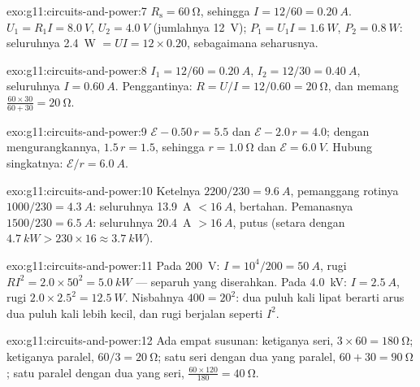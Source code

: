 \begin{solution}{exo:g11:circuits-and-power:7}
$R_{\text{s}} = \qty{60}{\ohm}$, sehingga $I = 12/60 = \qty{0.20}{A}$.
$U_1 = R_1 I = \qty{8.0}{V}$, $U_2 = \qty{4.0}{V}$ (jumlahnya
\qty{12}{V}); $P_1 = U_1 I = \qty{1.6}{W}$, $P_2 = \qty{0.8}{W}$:
seluruhnya \qty{2.4}{W} $= UI = 12 \times 0.20$, sebagaimana
seharusnya.
\end{solution}

\begin{solution}{exo:g11:circuits-and-power:8}
$I_1 = 12/60 = \qty{0.20}{A}$, $I_2 = 12/30 = \qty{0.40}{A}$,
seluruhnya $I = \qty{0.60}{A}$. Penggantinya:
$R = U/I = 12/0.60 = \qty{20}{\ohm}$, dan memang
$\frac{60 \times 30}{60 + 30} = \qty{20}{\ohm}$.
\end{solution}

\begin{solution}{exo:g11:circuits-and-power:9}
$\mathcal{E} - 0.50\,r = 5.5$ dan $\mathcal{E} - 2.0\,r = 4.0$; dengan
mengurangkannya, $1.5\,r = 1.5$, sehingga $r = \qty{1.0}{\ohm}$ dan
$\mathcal{E} =
\qty{6.0}{V}$. Hubung singkatnya:
$\mathcal{E}/r = \qty{6.0}{A}$.
\end{solution}

\begin{solution}{exo:g11:circuits-and-power:10}
Ketelnya $2200/230 = \qty{9.6}{A}$, pemanggang rotinya
$1000/230 = \qty{4.3}{A}$: seluruhnya \qty{13.9}{A} $< \qty{16}{A}$,
 bertahan. Pemanasnya $1500/230 =
\qty{6.5}{A}$: seluruhnya
\qty{20.4}{A} $> \qty{16}{A}$,  putus (setara dengan
$\qty{4.7}{kW} > 230 \times 16 \approx \qty{3.7}{kW}$).
\end{solution}

\begin{solution}{exo:g11:circuits-and-power:11}
Pada \qty{200}{V}: $I = 10^4/200 = \qty{50}{A}$, rugi 
$RI^2 = 2.0 \times
50^2 = \qty{5.0}{kW}$ --- separuh yang diserahkan.
Pada \qty{4.0}{kV}: $I =
\qty{2.5}{A}$, rugi 
$2.0 \times 2.5^2 = \qty{12.5}{W}$. Nisbahnya $400 =
20^2$: 
dua puluh kali lipat berarti arus dua puluh kali lebih kecil, dan rugi
 berjalan seperti $I^2$.
\end{solution}

\begin{solution}{exo:g11:circuits-and-power:12}
Ada empat susunan: ketiganya seri, $3 \times 60 = \qty{180}{\ohm}$;
ketiganya paralel, $60/3 = \qty{20}{\ohm}$; satu seri dengan dua yang
paralel, $60 + 30 = \qty{90}{\ohm}$; satu paralel dengan dua yang seri,
$\frac{60 \times 120}{180} = \qty{40}{\ohm}$.
\end{solution}

